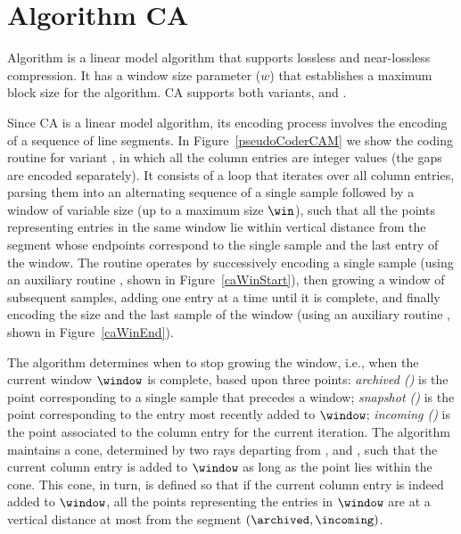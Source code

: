 
\clearpage

\section{Algorithm CA}
\label{algo:ca}


Algorithm \textit{\CAfull} \cite{coder:ca} is a linear model algorithm that supports lossless and near-lossless compression. It has a window size parameter ($w$) that establishes a maximum block size for the algorithm. CA supports both variants, \maskalgo and \NOmaskalgo.


Since CA is a linear model algorithm, its encoding process involves the encoding of a sequence of line segments. In Figure~\ref{pseudoCoderCAM} we show the coding routine for variant \maskalgo, in which all the column entries are integer values (the gaps are encoded separately). It consists of a loop that iterates over all column entries, parsing them into an alternating sequence of a single sample followed by a window of variable size (up to a maximum size $\win$), such that all the points representing entries in the same window lie within vertical distance \maxerror from the segment whose endpoints correspond to the single sample and the last entry of the window. The routine operates by successively encoding a single sample (using an auxiliary routine \CAWinStart, shown in Figure~\ref{caWinStart}), then growing a window of subsequent samples, adding one entry at a time until it is complete, and finally encoding the size and the last sample of the window (using an auxiliary routine \CAWinEnd, shown in Figure~\ref{caWinEnd}).





\clearpage








The algorithm determines when to stop growing the window, i.e., when the current window $\window$ is complete, based upon three points: \textit{archived (\archived)} is the point corresponding to a single sample that precedes a window; \textit{snapshot (\snapshot)} is the point corresponding to the entry most recently added to $\window$; \textit{incoming (\incoming)} is the point associated to the column entry for the current iteration. The algorithm maintains a cone, determined by two rays departing from \archived, \smin and \smax, such that the current column entry is added to $\window$ as long as the point \incoming lies within the cone. This cone, in turn, is defined so that if the current column entry is indeed added to $\window$, all the points representing the entries in $\window$ are at a vertical distance at most \maxerror from the segment $(\archived, \incoming)$.


